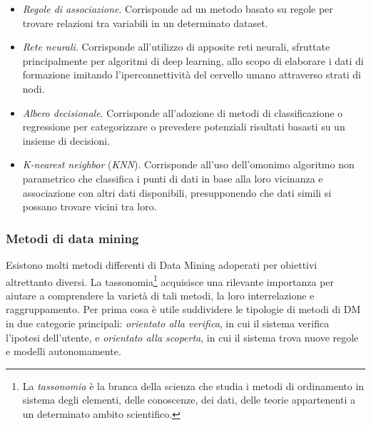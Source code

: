 \begin{itemize}
    \item \textit{Regole di associazione}. Corrisponde ad un metodo basato su regole per trovare relazioni tra variabili in un determinato dataset.
    \item \textit{Rete neurali}. Corrisponde all’utilizzo di apposite reti neurali, sfruttate principalmente per algoritmi di deep learning, allo scopo di elaborare i dati di formazione imitando l’iperconnettività del cervello umano attraverso strati di nodi.
    \item \textit{Albero decisionale}. Corrisponde all’adozione di metodi di classificazione o regressione per categorizzare o prevedere potenziali risultati basasti su un insieme di decisioni.
    \item \textit{K-nearest neighbor} (\textit{KNN}). Corrisponde all’uso dell’omonimo algoritmo non parametrico che classifica i punti di dati in base alla loro vicinanza e associazione con altri dati disponibili, presupponendo che dati simili si possano trovare vicini tra loro.
\end{itemize}

\subsubsection{Metodi di data mining}

Esistono molti metodi differenti di Data Mining adoperati per obiettivi altrettanto diversi. La tassonomia\footnote{La \textit{tassonomia} è la branca della scienza che studia i metodi di ordinamento in sistema degli elementi, delle conoscenze, dei dati, delle teorie appartenenti a un determinato ambito scientifico.\cite{treccani_tassonomia}} acquisisce una rilevante importanza per aiutare a comprendere la varietà di tali metodi, la loro interrelazione e raggruppamento. Per prima cosa è utile suddividere le tipologie di metodi di DM in due categorie principali: \textit{orientato alla verifica}, in cui il sistema verifica l’ipotesi dell’utente, e \textit{orientato alla scoperta}, in cui il sistema trova nuove regole e modelli autonomamente.\cite{data_mining_and_knowledge_discovery}

